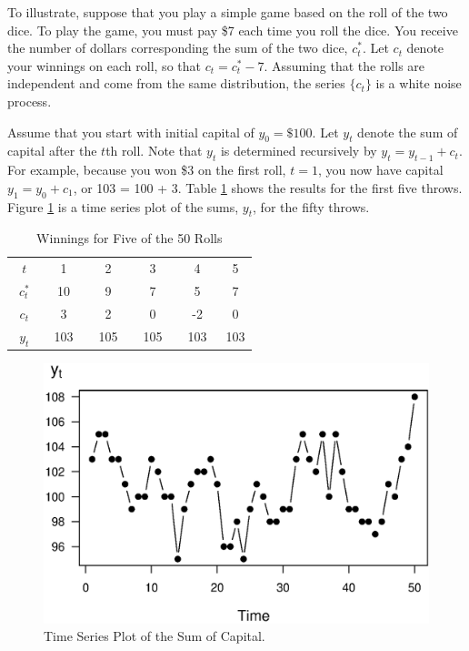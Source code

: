 To illustrate, suppose that you play a simple game based on the roll
of the two dice. To play the game, you must pay \$7 each time you
roll the dice. You receive the number of dollars corresponding the
sum of the two dice, $c_t^{\ast}$. Let $c_t$ denote your winnings on
each roll, so that $c_t = c_t^{\ast} - 7$. Assuming that the rolls
are independent and come from the same distribution, the series
$\{c_t\}$ is a white noise process.

Assume that you start with initial capital of $y_0 = \$100$. Let
$y_t$ denote the sum of capital after the $t$th roll. Note that
$y_t$ is determined recursively by $y_t = y_{t-1} + c_t$. For
example, because you won \$3 on the first roll, $t=1$, you now have
capital $y_1 = y_0 + c_1$, or 103 = 100 + 3. Table \ref{T7:Winnings}
shows the results for the first five throws. Figure \ref{F7:RWDice}
is a time series plot of the sums, $y_t$, for the fifty throws.

\begin{table}[h]
\caption{\label{T7:Winnings} Winnings for Five of the 50 Rolls}
\begin{center}
\begin{tabular}{c|ccccc}
\hline
$t$ & 1 & 2 & 3 & 4 & 5 \\
$c_t^{\ast }$ & 10 & 9 & 7 & 5 & 7 \\
$c_t$ & 3 & 2 & 0 & -2 & 0 \\
$~~y_t~~$ & ~103~ & ~105~ & ~105~ & ~103~ & 103 \\ \hline
\end{tabular}\end{center}\end{table}


\begin{figure}[htp]
  \begin{center}
    \includegraphics[width=.8\textwidth]{Chapter7Trend/RWDice.eps}
   \caption{\label{F7:RWDice} \small Time Series Plot of the Sum of Capital.}
  \end{center}
\end{figure}


